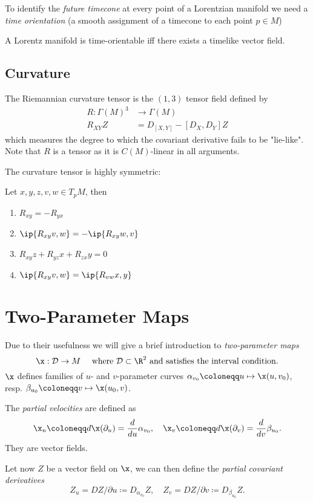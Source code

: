 To identify the \emph{future timecone} at every point of a Lorentzian manifold we need a \emph{time orientation} (a smooth assignment of a timecone to each point $p\in M$)
\begin{lemma}
A Lorentz manifold is time-orientable iff there exists a timelike vector field.
\end{lemma}

\subsection{Curvature}
The Riemannian curvature tensor is the $(1,3)$ tensor field defined by 
\begin{align*}
    R:\Gamma(M)^3&\to\Gamma(M)\\
    R_{XY}Z &= D_{[X,Y]} - [D_X,D_Y]Z
\end{align*}
which measures the degree to which the covariant derivative fails to be "lie-like".
Note that $R$ is a tensor as it is $C(M)$-linear in all arguments.

The curvature tensor is highly symmetric:
\begin{proposition}Let $x,y,z,v,w\in T_pM$, then

\begin{enumerate}
    \item $R_{xy}=-R_{yx}$
    \item $\ip{R_{xy}v,w}=-\ip{R_{xy}w,v}$
    \item $R_{xy}z+R_{yz}x+R_{zx}y=0$
    \item $\ip{R_{xy}v,w}=\ip{R_{vw}x,y}$
\end{enumerate}
\end{proposition}

\section{Two-Parameter Maps}
Due to their usefulness we will give a brief introduction to \emph{two-parameter maps}
\[
\x:\mathcal{D}\to M \quad \text{ where } \mathcal{D}\subset \R^2 \text{ and satisfies the interval condition.}
\]
$\x$ defines families of $u$- and $v$-parameter curves $\alpha_{v_0}\coloneqq u\mapsto \x(u,v_0)$, resp. $\beta_{u_0}\coloneqq v\mapsto \x(u_0,v)$.

The \emph{partial velocities} are defined as
\[
\x_u \coloneqq d\x(\partial_u) = \frac{d}{du}\alpha_{v_0}, \quad \x_v \coloneqq d\x(\partial_v) = \frac{d}{dv}\beta_{u_0}.
\]
They are vector fields.

Let now $Z$ be a vector field on $\x$, we can then define the \emph{partial covariant derivatives}
\[
Z_u = DZ/\partial u \coloneqq D_{\alpha_{v_0}}Z, \quad Z_v = DZ/\partial v \coloneqq D_{\beta_{u_0}}Z.
\]

